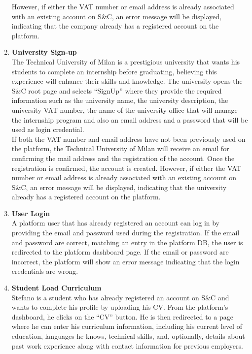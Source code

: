 \begin{enumerate}
        However, if either the VAT number or email address is already associated with an existing account on S\&C, an error message will be displayed, indicating that the company already has a registered account on the platform.
    \item \textbf{\textcolor{titleColor}{University Sign-up}}\\
        The Technical University of Milan is a prestigious university that wants his students to complete an internship before graduating, believing this experience will enhance their skills and knowledge. The university opens the S\&C root page and selects “SignUp” where they provide the required information such as the university name, the university description, the university VAT number, the name of the university office that will manage the internship program and also an email address and a password that will be used as login credential.\\
        If both the VAT number and email address have not been previously used on the platform, the Technical University of Milan will receive an email for confirming the mail address and the registration of the account. Once the registration is confirmed, the account is created.
        However, if either the VAT number or email address is already associated with an existing account on S\&C, an error message will be displayed, indicating that the university already has a registered account on the platform.
    \item \textbf{\textcolor{titleColor}{User Login}}\\
        A platform user that has already registered an account can log in by providing the email and password used during the registration. If the email and password are correct, matching an entry in the platform DB, the user is redirected to the platform dashboard page. If the email or password are incorrect, the platform will show an error message indicating that the login credentials are wrong.
    \item \textbf{\textcolor{titleColor}{Student Load Curriculum}}\\
        Stefano is a student who has already registered an account on S\&C and wants to complete his profile by uploading his CV. From the platform's dashboard, he clicks on the “CV” button. He is then redirected to a page where he can enter his curriculum information, including his current level of education, languages he knows, technical skills, and, optionally, details about past work experience along with contact information for previous employers.

\end{enumerate}

